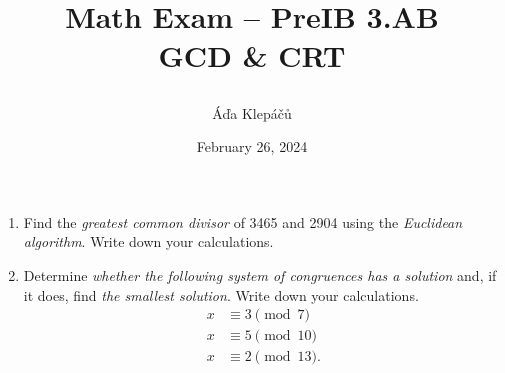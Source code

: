 \documentclass[a4paper,11pt]{article}
\title{\Huge\textsf{Math Exam -- PreIB 3.AB}\\
 \Large\textsf{GCD \& CRT}
 \author{Áďa Klepáčů}
 \date{February 26, 2024}
}
\begin{document}
\maketitle
\thispagestyle{fancy}

\begin{enumerate}
 \item Find the \emph{greatest common divisor} of 3465 and 2904 using the
  \emph{Euclidean algorithm}. Write down your calculations.
 \item Determine \emph{whether the following system of congruences has a
  solution} and, if it does, find \emph{the smallest solution}. Write down your
  calculations.
  \begin{align*}
   x & \equiv 3 \pmod{7}\\
   x & \equiv 5 \pmod{10}\\
   x & \equiv 2 \pmod{13}.
  \end{align*}
\end{enumerate}
\end{document}
